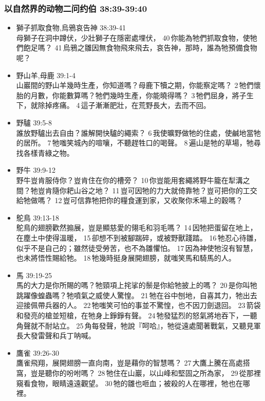 \subsubsection{以自然界的动物二问约伯 38:39-39:40}
\begin{itemize}
\itemsep-.45em
\item 獅子抓取食物,烏鴉哀告神 38:39-41\\
母獅子在洞中蹲伏，少壯獅子在隱密處埋伏， 40 你能為牠們抓取食物，使牠們飽足嗎？ 41 烏鴉之雛因無食物飛來飛去，哀告神，那時，誰為牠預備食物呢？

\item 野山羊,母鹿 39:1-4\\
山巖間的野山羊幾時生產，你知道嗎？母鹿下犢之期，你能察定嗎？ 2 牠們懷胎的月數，你能數算嗎？牠們幾時生產，你能曉得嗎？ 3 牠們屈身，將子生下，就除掉疼痛。 4 這子漸漸肥壯，在荒野長大，去而不回。

\item 野驢 39:5-8\\
誰放野驢出去自由？誰解開快驢的繩索？ 6 我使曠野做牠的住處，使鹹地當牠的居所。 7 牠嗤笑城內的喧嚷，不聽趕牲口的喝聲。 8 遍山是牠的草場，牠尋找各樣青綠之物。

\item 野牛 39:9-12\\
野牛豈肯服侍你？豈肯住在你的槽旁？ 10 你豈能用套繩將野牛籠在犁溝之間？牠豈肯隨你耙山谷之地？ 11 豈可因牠的力大就倚靠牠？豈可把你的工交給牠做嗎？ 12 豈可信靠牠把你的糧食運到家，又收聚你禾場上的穀嗎？

\item 鴕鳥 39:13-18\\
鴕鳥的翅膀歡然搧展，豈是顯慈愛的翎毛和羽毛嗎？ 14 因牠把蛋留在地上，在塵土中使得溫暖， 15 卻想不到被腳踹碎，或被野獸踐踏。 16 牠忍心待雛，似乎不是自己的；雖然徒受勞苦，也不為雛懼怕。 17 因為神使牠沒有智慧，也未將悟性賜給牠。 18 牠幾時挺身展開翅膀，就嗤笑馬和騎馬的人。

\item 馬 39:19-25 \\
馬的大力是你所賜的嗎？牠頸項上挓挲的鬃是你給牠披上的嗎？ 20 是你叫牠跳躍像蝗蟲嗎？牠噴氣之威使人驚惶。 21 牠在谷中刨地，自喜其力，牠出去迎接佩帶兵器的人。 22 牠嗤笑可怕的事並不驚惶，也不因刀劍退回。 23 箭袋和發亮的槍並短槍，在牠身上錚錚有聲。 24 牠發猛烈的怒氣將地吞下，一聽角聲就不耐站立。 25 角每發聲，牠說『呵哈』，牠從遠處聞著戰氣，又聽見軍長大發雷聲和兵丁呐喊。

\item 鷹雀 39:26-30\\
鷹雀飛翔，展開翅膀一直向南，豈是藉你的智慧嗎？ 27 大鷹上騰在高處搭窩，豈是聽你的吩咐嗎？ 28 牠住在山巖，以山峰和堅固之所為家， 29 從那裡窺看食物，眼睛遠遠觀望。 30 牠的雛也咂血；被殺的人在哪裡，牠也在哪裡。
\end{itemize}

